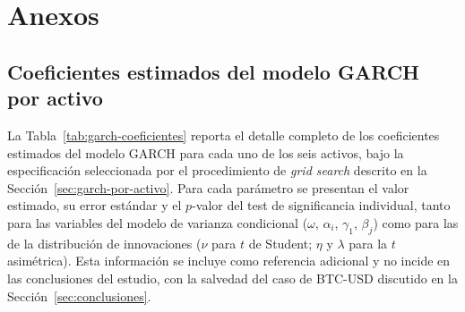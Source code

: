 \documentclass[12pt]{paper}
\begin{document}
\newpage



\newpage
\appendix
\section{Anexos}

\subsection{Coeficientes estimados del modelo GARCH por activo}
\label{ap:garch-coeficientes}

La Tabla~\ref{tab:garch-coeficientes} reporta el detalle completo de los coeficientes estimados del modelo GARCH para cada uno de los seis activos, bajo la especificación seleccionada por el procedimiento de \textit{grid search} descrito en la Sección~\ref{sec:garch-por-activo}. Para cada parámetro se presentan el valor estimado, su error estándar y el $p$-valor del test de significancia individual, tanto para las variables del modelo de varianza condicional ($\omega$, $\alpha_i$, $\gamma_1$, $\beta_j$) como para las de la distribución de innovaciones ($\nu$ para $t$ de Student; $\eta$ y $\lambda$ para la $t$ asimétrica). Esta información se incluye como referencia adicional y no incide en las conclusiones del estudio, con la salvedad del caso de BTC-USD discutido en la Sección~\ref{sec:conclusiones}.
\end{document}
